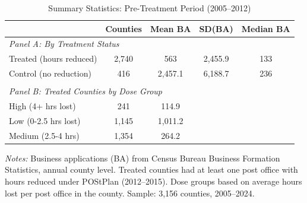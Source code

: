 \begin{table}[htbp]
\centering
\caption{Summary Statistics: Pre-Treatment Period (2005--2012)}
\label{tab:summary}
\begin{tabular}{lcccc}
\hline\hline
 & Counties & Mean BA & SD(BA) & Median BA \\
\hline
\multicolumn{5}{l}{\textit{Panel A: By Treatment Status}} \\[3pt]
Treated (hours reduced) & 2,740 & 563 & 2,455.9 & 133 \\
Control (no reduction) & 416 & 2,457.1 & 6,188.7 & 236 \\
\\
\multicolumn{5}{l}{\textit{Panel B: Treated Counties by Dose Group}} \\[3pt]
High (4+ hrs lost) & 241 & 114.9 & & \\
Low (0-2.5 hrs lost) & 1,145 & 1,011.2 & & \\
Medium (2.5-4 hrs) & 1,354 & 264.2 & & \\
\hline\hline
\end{tabular}
\begin{tablenotes}[flushleft]\small
\item \textit{Notes:} Business applications (BA) from Census Bureau Business Formation Statistics, annual county level. Treated counties had at least one post office with hours reduced under POStPlan (2012--2015). Dose groups based on average hours lost per post office in the county. Sample: 3,156 counties, 2005--2024.
\end{tablenotes}
\end{table}
